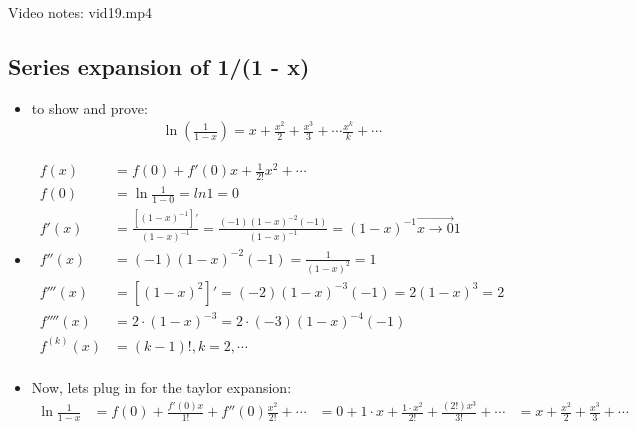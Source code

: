 Video notes: vid19.mp4

\subsection*{Series expansion of 1/(1 - x)}
\begin{itemize}
\item{to show and prove:
\begin{align*}
\ln (\frac{1}{1 - x}) = x + 
\frac{x^2}{2} + \frac{x^{3}}{3} + \cdots \frac{x^{k}}{k} + \cdots
\end{align*}
}
\item{
\begin{align*}
f(x) &= f(0) + f'(0)x + \frac{1}{2!}x^2 + \cdots \\
f(0) &= \ln{ \frac{1}{1 - 0} } = ln{1} = 0 \\
f'(x) &=  \frac{[(1 - x)^{-1}]'}{(1 - x)^{-1}} = 
\frac{
    (-1)(1 - x)^{-2}(-1)
} {
    (1 - x)^{-1}
}
= (1 - x)^{-1} \stackrel{\longrightarrow}{x \rightarrow 0} 1 \\
f''(x) &= (-1)(1 - x)^{-2}(-1) = \frac{1}{(1 - x)^2} = 1 \\
f'''(x) &= [(1 - x)^2]' = (-2)(1 - x)^{-3}(-1) = 2(1 - x)^3 = 2 \\
f''''(x) &= 2 \cdot (1 - x)^{-3} = 2 \cdot(-3)(1 - x)^{-4}(-1)  \\
f^(k)(x) &= (k - 1)!, k = 2, \cdots \\
\end{align*} 
}
\item{
Now, lets plug in for the taylor expansion:
\begin{align*}
\ln{\frac{1}{1 - x}} &= f(0) + \frac{f'(0)x}{1!} + f''(0)\frac{x^2}{2!} + \cdots
&= 0 + 1 \cdot x + \frac{1 \cdot x^2}{2!} + \frac{(2!)x^3}{3!} + \cdots
&= x + \frac{x^2}{2} + \frac{x^3}{3} + \cdots
\end{align*}
}
\end{itemize}
